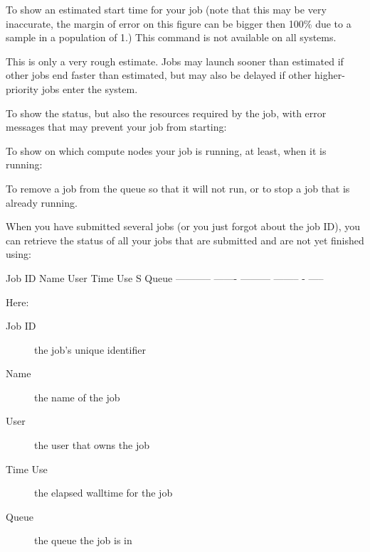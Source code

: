 \ifgent
\else
\ifbrussel
\else
  To show an estimated start time for your job (note that this may be very inaccurate,
  the margin of error on this figure can be bigger then 100\% due to a sample in a
  population of 1.)
  This command is not available on all systems.

\begin{prompt}
\end{prompt}

  This is only a very rough estimate. Jobs may launch sooner than estimated if
  other jobs end faster than estimated, but may also be delayed if other
  higher-priority jobs enter the system.

  To show the status, but also the resources required by the job, with error
  messages that may prevent your job from starting:

\begin{prompt}
\end{prompt}
\fi
\fi

To show on which compute nodes your job is running, at least, when it is
running:

\begin{prompt}
\end{prompt}

To remove a job from the queue so that it will not run, or to stop a job that
is already running.

\begin{prompt}
\end{prompt}

When you have submitted several jobs (or you just forgot about the job ID), you
can retrieve the status of all your jobs that are submitted and are not yet
finished using:

\begin{prompt}
Job ID      Name    User      Time Use S Queue
----------- ------- --------- -------- - -----
\end{prompt}

Here:
\begin{description}
  \item[Job ID] the job's unique identifier
  \item[Name] the name of the job
  \item[User] the user that owns the job
  \item[Time Use] the elapsed walltime for the job
  \item[Queue] the queue the job is in
\end{description}

